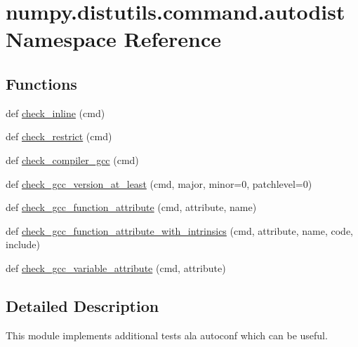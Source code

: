 \hypertarget{namespacenumpy_1_1distutils_1_1command_1_1autodist}{}\section{numpy.\+distutils.\+command.\+autodist Namespace Reference}
\label{namespacenumpy_1_1distutils_1_1command_1_1autodist}
\subsection*{Functions}
\begin{DoxyCompactItemize}
\item 
def \hyperlink{namespacenumpy_1_1distutils_1_1command_1_1autodist_a1efb0a5f1e8a5aad7354b65a5fe942c3}{check\+\_\+inline} (cmd)
\item 
def \hyperlink{namespacenumpy_1_1distutils_1_1command_1_1autodist_ab6ef0b2d2c101357603bd0c5fb28f674}{check\+\_\+restrict} (cmd)
\item 
def \hyperlink{namespacenumpy_1_1distutils_1_1command_1_1autodist_a7dfe246c79f8edd6ae57da61c662ebf7}{check\+\_\+compiler\+\_\+gcc} (cmd)
\item 
def \hyperlink{namespacenumpy_1_1distutils_1_1command_1_1autodist_a3db958977b8f7a41f3f6b597a603cde1}{check\+\_\+gcc\+\_\+version\+\_\+at\+\_\+least} (cmd, major, minor=0, patchlevel=0)
\item 
def \hyperlink{namespacenumpy_1_1distutils_1_1command_1_1autodist_a6c38a6be391c2ddb6df03b5b3baba2eb}{check\+\_\+gcc\+\_\+function\+\_\+attribute} (cmd, attribute, name)
\item 
def \hyperlink{namespacenumpy_1_1distutils_1_1command_1_1autodist_a65f9c608d2305b356fa894308914620e}{check\+\_\+gcc\+\_\+function\+\_\+attribute\+\_\+with\+\_\+intrinsics} (cmd, attribute, name, code, include)
\item 
def \hyperlink{namespacenumpy_1_1distutils_1_1command_1_1autodist_ad25ccba1ec94fd0619417d5f9b13e98f}{check\+\_\+gcc\+\_\+variable\+\_\+attribute} (cmd, attribute)
\end{DoxyCompactItemize}


\subsection{Detailed Description}
\begin{DoxyVerb}This module implements additional tests ala autoconf which can be useful.\end{DoxyVerb}
 


